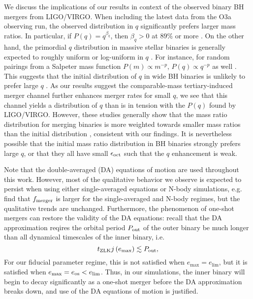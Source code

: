 \documentclass[
        fleqn,
        usenatbib,
    ]{mnras}
\newcommand*{\p}[1]{\left(#1\right)}
\begin{document}
We discuss the implications of our results in context of the observed binary BH
mergers from LIGO/VIRGO\@. When including the latest data from the O3a observing
run, the observed distribution in $q$ significantly prefers larger mass ratios.
In particular, if $P(q) = q^{\beta_q}$, then $\beta_q > 0$ at $89\%$ or more
\citep{LIGOO3a}. On the other hand, the primordial $q$ distribution in massive
stellar binaries is generally expected to roughly uniform or log-uniform in $q$
\citep[e.g.,][]{sana2012binary, duchene2013, kobulnicky2014, moe2017mind}. For
instance, for random pairings from a Salpeter mass function $P(m) \propto
m^{-p}$, $P(q) \propto q^{-p}$ as well \citep[see also
Appendix~\ref{s:ratios}]{moe2017mind}. This suggests that the initial
distribution of $q$ in wide BH binaries is unlikely to prefer large $q$
\citep[for reasonable assumptions on BH remnant masses after supernovae, see
e.g.][]{farmer_bhmass}. As our results suggest the comparable-mass
tertiary-induced merger channel further enhances merger rates for small $q$, we
see that this channel yields a distribution of $q$ than is in tension with the
$P(q)$ found by LIGO/VIRGO\@. However, these studies generally show that the
mass ratio distribution for merging binaries is more weighted towards smaller
mass ratios than the initial distribution \citep{silsbee2017lidov,
fragione2019}, consistent with our findings. It is nevertheless possible that
the initial mass ratio distribution in BH binaries strongly prefers large $q$,
or that they all have small $\epsilon_{\rm oct}$ such that the $q$ enhancement
is weak.

Note that the double-averaged (DA) equations of motion are used throughout this
work. However, most of the qualitative behavior we observe is expected to
persist when using either single-averaged equations or N-body simulations, e.g.\
\citet{LL19} find that $f_{\rm merger}$ is larger for the single-averaged and
N-body regimes, but the qualitative trends are unchanged. Furthermore, the
phenomenon of one-shot mergers can restore the validity of the DA equations:
recall that the DA approximation reqires the orbital period $P_{\rm out}$ of the
outer binary be much longer than all dynamical timescales of the inner binary,
i.e.
\begin{equation}
    t_{\rm ZLK}j\p{e_{\max}} \lesssim P_{\rm out},
\end{equation}
For our fiducial parameter regime, this is not satisfied when $e_{\max} =
e_{\lim}$, but it is satisfied when $e_{\max} = e_{\rm os} < e_{\lim}$. Thus,
in our simulations, the inner binary will begin to decay significantly as a
one-shot merger before the DA approximation breaks down, and use of the DA
equations of motion is justified.
\end{document}
